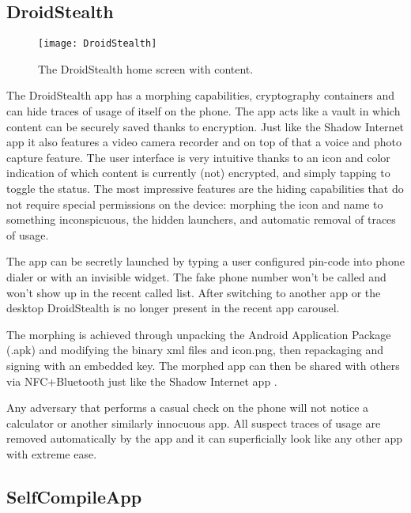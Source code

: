 \documentclass[conference,compsoc]{IEEEtran}
\begin{document}
\subsection{DroidStealth}

\begin{figure}[b!]
\centering
\texttt{[image: DroidStealth]}
\caption{The DroidStealth home screen with content.}
\label{fig_droidstealth}
\end{figure}

The DroidStealth app has a morphing capabilities, cryptography containers and can hide traces of usage of itself on the phone.
The app acts like a vault in which content can be securely saved thanks to encryption.
Just like the Shadow Internet app \cite{tribler2015shadowinternet} it also features a video camera recorder and on top of that a voice and photo capture feature. \cite{hokke2015droidstealth, tudelft2014droidstealth}
The user interface is very intuitive thanks to an icon and color indication of which content is currently (not) encrypted, and simply tapping to toggle the status.
The most impressive features are the hiding capabilities that do not require special permissions on the device: morphing the icon and name to something inconspicuous, the hidden launchers, and automatic removal of traces of usage.

The app can be secretly launched by typing a user configured pin-code into phone dialer or with an invisible widget.
The fake phone number won't be called and won't show up in the recent called list.
After switching to another app or the desktop DroidStealth is no longer present in the recent app carousel.

The morphing is achieved through unpacking the Android Application Package (.apk) and modifying the binary xml files and icon.png, then repackaging and signing with an embedded key.
The morphed app can then be shared with others via NFC+Bluetooth just like the Shadow Internet app \cite{tribler2015shadowinternet}.

Any adversary that performs a casual check on the phone will not notice a calculator or another similarly innocuous app.
All suspect traces of usage are removed automatically by the app and it can superficially look like any other app with extreme ease.


\subsection{SelfCompileApp}
\end{document}
